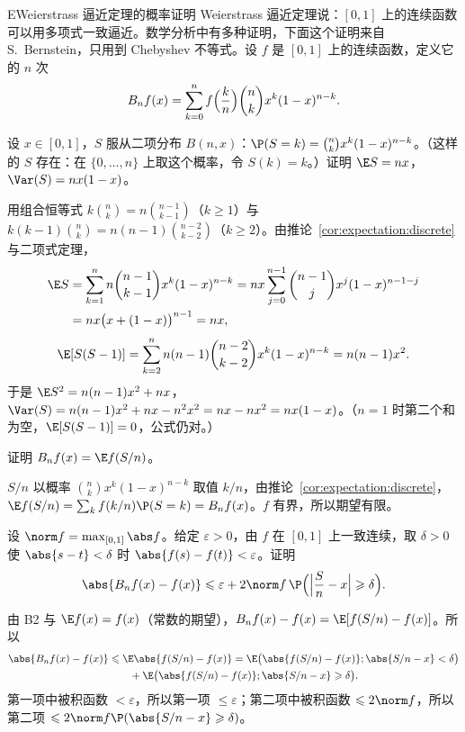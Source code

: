 
\begin{probleme}{E}{Weierstrass 逼近定理的概率证明}
Weierstrass 逼近定理说：$[0,1]$ 上的连续函数可以用多项式一致逼近。数学分析中有多种证明，下面这个证明来自 S.\ Bernstein，只用到 Chebyshev 不等式。设 $f$ 是 $[0,1]$ 上的连续函数，定义它的 $n$ 次 
\[
B_nf(x)=\sum_{k=0}^nf\Bigl(\frac kn\Bigr)\binom nkx^k(1-x)^{n-k}.
\]
\begin{questions}
\item 设 $x\in[0,1]$，$S$ 服从二项分布 $B(n,x)$：$\P(S=k)=\binom nkx^k(1-x)^{n-k}$。（这样的 $S$ 存在：在 $\{0,\dots,n\}$ 上取这个概率，令 $S(k)=k$。）证明 $\E S=nx$，$\Var(S)=nx(1-x)$。
\begin{solution}
用组合恒等式 $k\binom nk=n\binom{n-1}{k-1}$（$k\geqslant1$）与 $k(k-1)\binom nk=n(n-1)\binom{n-2}{k-2}$（$k\geqslant2$）。由推论~\ref{cor:expectation:discrete} 与二项式定理，
\[
\begin{aligned}
\E S&=\sum_{k=1}^nn\binom{n-1}{k-1}x^k(1-x)^{n-k}=nx\sum_{j=0}^{n-1}\binom{n-1}jx^j(1-x)^{n-1-j}\\
&=nx\bigl(x+(1-x)\bigr)^{n-1}=nx,
\end{aligned}
\]
\[
\E[S(S-1)]=\sum_{k=2}^nn(n-1)\binom{n-2}{k-2}x^k(1-x)^{n-k}=n(n-1)x^2 .
\]
于是 $\E S^2=n(n-1)x^2+nx$，$\Var(S)=n(n-1)x^2+nx-n^2x^2=nx-nx^2=nx(1-x)$。（$n=1$ 时第二个和为空，$\E[S(S-1)]=0$，公式仍对。）
\end{solution}

\item 证明 $B_nf(x)=\E f(S/n)$。
\begin{solution}
$S/n$ 以概率 $\binom nkx^k(1-x)^{n-k}$ 取值 $k/n$，由推论~\ref{cor:expectation:discrete}，$\E f(S/n)=\sum_kf(k/n)\P(S=k)=B_nf(x)$。$f$ 有界，所以期望有限。
\end{solution}

\item 设 $\norm f=\max_{[0,1]}\abs f$。给定 $\varepsilon>0$，由 $f$ 在 $[0,1]$ 上一致连续，取 $\delta>0$ 使 $\abs{s-t}<\delta$ 时 $\abs{f(s)-f(t)}<\varepsilon$。证明
\[
\abs{B_nf(x)-f(x)}\leqslant\varepsilon+2\norm f\,\P\Bigl(\Bigl\lvert\frac Sn-x\Bigr\rvert\geqslant\delta\Bigr).
\]
\begin{solution}
由 B2 与 $\E f(x)=f(x)$（常数的期望），$B_nf(x)-f(x)=\E[f(S/n)-f(x)]$。所以
\[
\begin{aligned}
\abs{B_nf(x)-f(x)}&\leqslant \E\abs{f(S/n)-f(x)}=\E\bigl(\abs{f(S/n)-f(x)};\abs{S/n-x}<\delta\bigr)\\
&\qquad+\E\bigl(\abs{f(S/n)-f(x)};\abs{S/n-x}\geqslant\delta\bigr).
\end{aligned}
\]
第一项中被积函数 $<\varepsilon$，所以第一项 $\leqslant\varepsilon$；第二项中被积函数 $\leqslant2\norm f$，所以第二项 $\leqslant2\norm f\P(\abs{S/n-x}\geqslant\delta)$。
\end{solution}


\end{questions}
\end{probleme}
